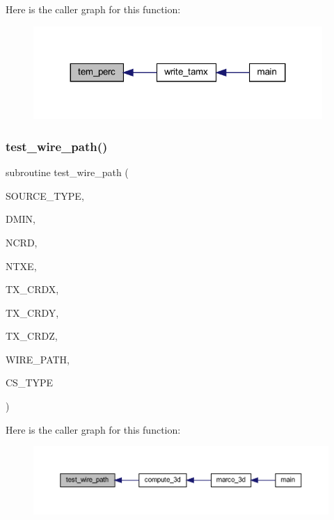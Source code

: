 Here is the caller graph for this function\+:
\nopagebreak
\begin{figure}[H]
\begin{center}
\leavevmode
\includegraphics[width=311pt]{Marco_8f90_a130e19214a557786f1a455a211b9c738_icgraph}
\end{center}
\end{figure}
\mbox{\label{Marco_8f90_afcc3a0e809d5eef600ba9aeb1417a18f}} 
\subsubsection{\texorpdfstring{test\+\_\+wire\+\_\+path()}{test\_wire\_path()}}
{\footnotesize\ttfamily subroutine test\+\_\+wire\+\_\+path (\begin{DoxyParamCaption}\item[{integer, intent(in)}]{S\+O\+U\+R\+C\+E\+\_\+\+T\+Y\+PE,  }\item[{real, intent(in)}]{D\+M\+IN,  }\item[{integer, intent(in)}]{N\+C\+RD,  }\item[{integer, intent(in)}]{N\+T\+XE,  }\item[{real, dimension(ncrd,ntxe), intent(in)}]{T\+X\+\_\+\+C\+R\+DX,  }\item[{real, dimension(ncrd,ntxe), intent(in)}]{T\+X\+\_\+\+C\+R\+DY,  }\item[{real, dimension(ncrd,ntxe), intent(in)}]{T\+X\+\_\+\+C\+R\+DZ,  }\item[{integer, intent(out)}]{W\+I\+R\+E\+\_\+\+P\+A\+TH,  }\item[{integer, intent(out)}]{C\+S\+\_\+\+T\+Y\+PE }\end{DoxyParamCaption})}

Here is the caller graph for this function\+:
\nopagebreak
\begin{figure}[H]
\begin{center}
\leavevmode
\includegraphics[width=350pt]{Marco_8f90_afcc3a0e809d5eef600ba9aeb1417a18f_icgraph}
\end{center}
\end{figure}
\mbox{\label{Marco_8f90_a64bc8866e9fffd5b13a9903edf4aab07}} 
